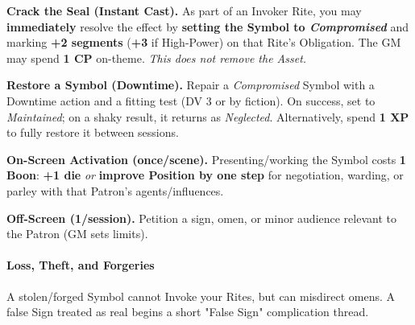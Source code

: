 \documentclass[12pt,twoside]{book}
\begin{document}
\textbf{Crack the Seal (Instant Cast).} As part of an Invoker Rite, you may \textbf{immediately} resolve the effect by \textbf{setting the Symbol to \emph{Compromised}} and marking \textbf{+2 segments} (\textbf{+3} if High-Power) on that Rite's Obligation. The GM may spend \textbf{1 CP} on-theme. \emph{This does not remove the Asset.}

\textbf{Restore a Symbol (Downtime).} Repair a \emph{Compromised} Symbol with a Downtime action and a fitting test (DV 3 or by fiction). On success, set to \emph{Maintained}; on a shaky result, it returns as \emph{Neglected}. Alternatively, spend \textbf{1 XP} to fully restore it between sessions.

\textbf{On-Screen Activation (once/scene).} Presenting/working the Symbol costs \textbf{1 Boon}: \textbf{+1 die} \emph{or} \textbf{improve Position by one step} for negotiation, warding, or parley with that Patron's agents/influences.

\textbf{Off-Screen (1/session).} Petition a sign, omen, or minor audience relevant to the Patron (GM sets limits).

\paragraph{Loss, Theft, and Forgeries}
A stolen/forged Symbol cannot Invoke your Rites, but can misdirect omens. A false Sign treated as real begins a short "False Sign" complication thread.
\end{document}
